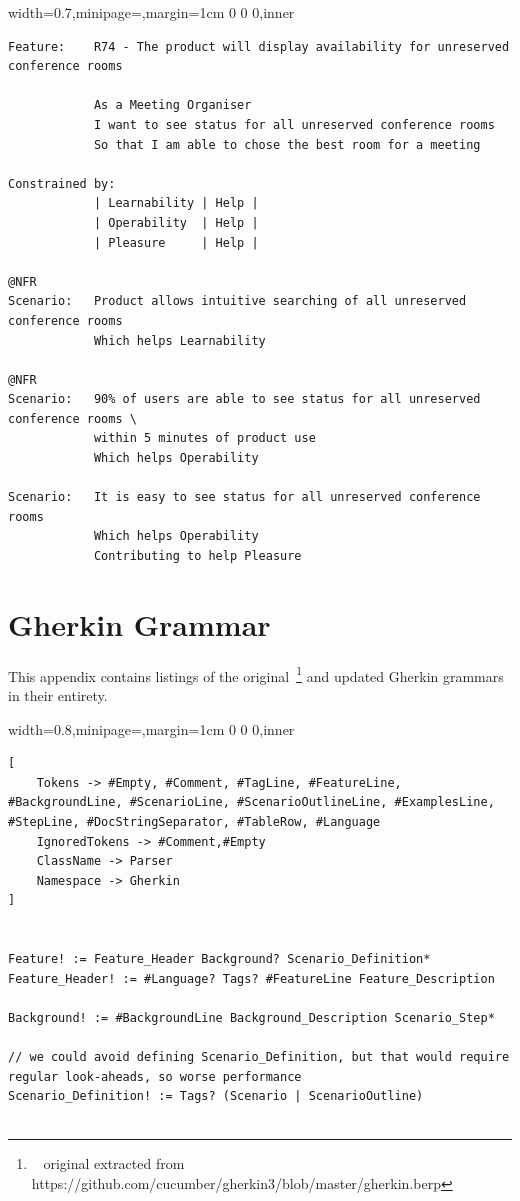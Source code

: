 \documentclass[dissertation,final]{softeng}
\newenvironment{featurecode}[1]
{ \lrbox\featurebox \begin{adjustbox}{width=#1\textwidth,minipage=\textwidth,margin=1cm 0 0 0,inner} }
{ \end{adjustbox}\endlrbox}
\newenvironment{featurelist}[2]
{
\newcommand{\setcaption}{\caption{#1}}
\newcommand{\setlabel}{\label{#2}}
}
{\begin{listing}[h!]\centering\usebox\featurebox\setcaption\setlabel\end{listing}}
\begin{document}
\begin{appendices}
\begin{featurelist}{R74 -- The product will display availability for unreserved conference rooms}{lst:feature_r74}
\begin{featurecode}{0.7}
\begin{verbatim}
Feature:    R74 - The product will display availability for unreserved conference rooms

            As a Meeting Organiser
            I want to see status for all unreserved conference rooms
            So that I am able to chose the best room for a meeting
	
Constrained by:
            | Learnability | Help |
            | Operability  | Help |
            | Pleasure     | Help |			

@NFR	
Scenario:   Product allows intuitive searching of all unreserved conference rooms
            Which helps Learnability

@NFR	
Scenario:   90% of users are able to see status for all unreserved conference rooms \
            within 5 minutes of product use
            Which helps Operability
	
Scenario:   It is easy to see status for all unreserved conference rooms
            Which helps Operability
            Contributing to help Pleasure
\end{verbatim}
\end{featurecode}
\end{featurelist}

\chapter{Gherkin Grammar}
This appendix contains listings of the original~\footnote{~ original extracted from https://github.com/cucumber/gherkin3/blob/master/gherkin.berp} and updated Gherkin grammars in their entirety.

\begin{featurelist}{Original gherkin grammar}{lst:original_gherkin_grammar}
\begin{featurecode}{0.8}
\begin{verbatim}
[
	Tokens -> #Empty, #Comment, #TagLine, #FeatureLine, #BackgroundLine, #ScenarioLine, #ScenarioOutlineLine, #ExamplesLine, #StepLine, #DocStringSeparator, #TableRow, #Language
	IgnoredTokens -> #Comment,#Empty
	ClassName -> Parser
	Namespace -> Gherkin
]


Feature! := Feature_Header Background? Scenario_Definition*
Feature_Header! := #Language? Tags? #FeatureLine Feature_Description

Background! := #BackgroundLine Background_Description Scenario_Step*

// we could avoid defining Scenario_Definition, but that would require regular look-aheads, so worse performance
Scenario_Definition! := Tags? (Scenario | ScenarioOutline)


\end{verbatim}
\end{featurecode}
\end{featurelist}
\end{appendices}
\end{document}
